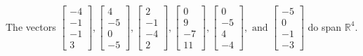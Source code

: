 \begin{exercise}
\begin{exerciseStatement}
  \end{exerciseStatement}
  \begin{exerciseAnswer}
   The vectors \(\left[\begin{array}{r}
-4 \\
-1 \\
-1 \\
3
\end{array}\right] , \left[\begin{array}{r}
4 \\
-5 \\
0 \\
-5
\end{array}\right] , \left[\begin{array}{r}
2 \\
-1 \\
-4 \\
2
\end{array}\right] , \left[\begin{array}{r}
0 \\
9 \\
-7 \\
11
\end{array}\right] , \left[\begin{array}{r}
0 \\
-5 \\
4 \\
-4
\end{array}\right] , \text{ and } \left[\begin{array}{r}
-5 \\
0 \\
-1 \\
-3
\end{array}\right]\) 
  	 do  
	span \(\mathbb{R}^4\).
  


  \end{exerciseAnswer}
\end{exercise}